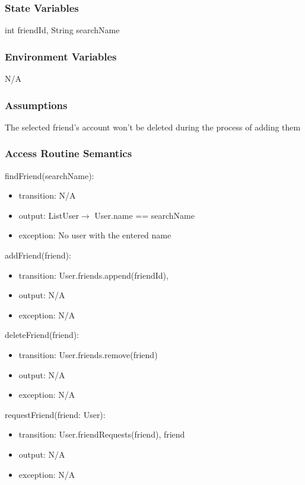 \documentclass[12pt, titlepage]{article}
\begin{document}
\subsubsection{State Variables}
int friendId, String searchName

\subsubsection{Environment Variables}
N/A

\subsubsection{Assumptions}
The selected friend's account won't be deleted during the process of adding them

\subsubsection{Access Routine Semantics}

\noindent findFriend(searchName):
\begin{itemize}
\item transition: N/A
\item output: List\textlangle User\textrangle $\rightarrow$ User.name == searchName
\item exception: No user with the entered name
\end{itemize}

\noindent addFriend(friend):
\begin{itemize}
\item transition: User.friends.append(friendId), 
\item output: N/A
\item exception: N/A
\end{itemize}

\noindent deleteFriend(friend):
\begin{itemize}
\item transition: User.friends.remove(friend)
\item output: N/A
\item exception: N/A
\end{itemize}

\noindent requestFriend(friend: User):
\begin{itemize}
	\item transition: User.friendRequests(friend), friend
	\item output: N/A
	\item exception: N/A
\end{itemize}
\end{document}
